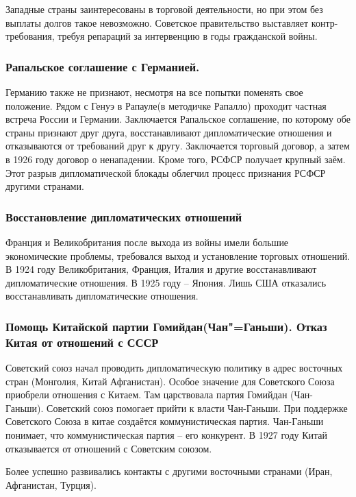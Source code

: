 Западные страны заинтересованы в торговой деятельности, но при этом без выплаты долгов такое невозможно. Советское правительство выставляет контр-требования, требуя репараций за интервенцию в годы гражданской войны. 

\subsubsection{\textbf{Рапальское соглашение с Германией.}}

Германию также не признают, несмотря на все попытки поменять свое положение. Рядом с Генуэ в Рапауле(в методичке Рапалло) проходит частная встреча России и Германии. Заключается Рапальское соглашение, по которому обе страны признают друг друга, восстанавливают дипломатические отношения и отказываются от требований друг к другу. Заключается торговый договор, а затем в 1926 году договор о ненападении. Кроме того, РСФСР получает крупный заём. Этот разрыв дипломатической блокады облегчил процесс признания РСФСР другими странами. 

\subsubsection{\textbf{Восстановление дипломатических отношений}}

Франция и Великобритания после выхода из войны имели большие экономические проблемы, требовался выход и установление торговых отношений. В 1924 году Великобритания, Франция, Италия и другие восстанавливают дипломатические отношения. В 1925 году – Япония. Лишь США отказались восстанавливать дипломатические отношения.

\subsubsection{\textbf{Помощь Китайской партии Гомийдан(Чан"=Ганьши). Отказ Китая от отношений с СССР}}

Советский союз начал проводить дипломатическую политику в адрес восточных стран (Монголия, Китай Афганистан). Особое значение для Советского Союза приобрели отношения с Китаем. Там царствовала партия Гомийдан (Чан-Ганьши). Советский союз помогает прийти к власти Чан-Ганьши. При поддержке Советского Союза в китае создаётся коммунистическая партия. Чан-Ганьши понимает, что коммунистическая партия – его конкурент. В 1927 году Китай отказывается от отношений с Советским союзом.

Более успешно развивались контакты с другими восточными странами (Иран, Афганистан, Турция). 

